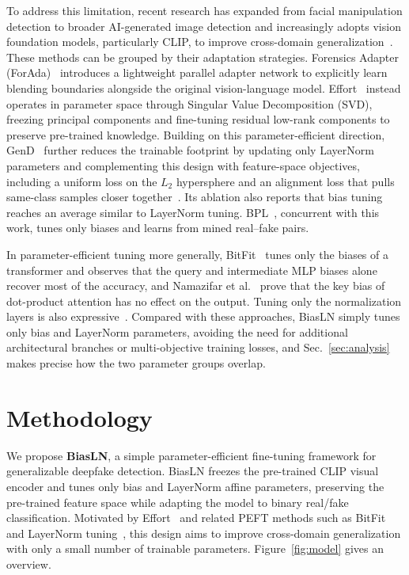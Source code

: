 \documentclass[fonts]{icst}
\newif\ifrevmark\revmarkfalse
\newcommand{\rev}[1]{\ifrevmark{\color{revblue}#1}\else#1\fi}
\begin{document}
To address this limitation, recent research has expanded from facial manipulation detection to broader AI-generated image detection and increasingly adopts vision foundation models, particularly CLIP, to improve cross-domain generalization~\cite{ojha2023universal,cui2025forada,yan2025effort,yermakov2025gend}. These methods can be grouped by their adaptation strategies. \rev{Forensics Adapter (ForAda)}~\cite{cui2025forada} introduces a lightweight parallel adapter network to explicitly learn blending boundaries alongside the original vision-language model. Effort~\cite{yan2025effort} instead operates in parameter space through Singular Value Decomposition (SVD), freezing principal components and fine-tuning residual low-rank components to preserve pre-trained knowledge. Building on this parameter-efficient direction, GenD~\cite{yermakov2025gend} further reduces the trainable footprint by updating only LayerNorm parameters and complementing this design with feature-space objectives, including a uniform loss on the $L_2$ hypersphere and an alignment loss that pulls same-class samples closer together\rev{~\cite{wang2020alignment}. Its ablation also reports that bias tuning reaches an average similar to LayerNorm tuning. BPL~\cite{xu2026bpl}, concurrent with this work, tunes only biases and learns from mined real--fake pairs.}

\rev{In parameter-efficient tuning more generally, BitFit~\cite{benzaken2022bitfit} tunes only the biases of a transformer and observes that the query and intermediate MLP biases alone recover most of the accuracy, and Namazifar et al.~\cite{namazifar2023bias} prove that the key bias of dot-product attention has no effect on the output. Tuning only the normalization layers is also expressive~\cite{giannou2023layernorm,wang2022ln,valizadeh2024layernorm}.}
Compared with these approaches, BiasLN simply tunes only bias and LayerNorm parameters, avoiding the need for additional architectural branches or multi-objective training losses\rev{, and Sec.~\ref{sec:analysis} makes precise how the two parameter groups overlap.}


\section{Methodology}
\label{sec:method}

We propose \textbf{BiasLN}, a simple parameter-efficient fine-tuning framework for generalizable deepfake detection. BiasLN freezes the pre-trained CLIP visual encoder and tunes only bias and LayerNorm affine parameters, preserving the pre-trained feature space while adapting the model to binary real/fake classification. Motivated by Effort~\cite{yan2025effort} and related PEFT methods such as BitFit~\cite{benzaken2022bitfit} and LayerNorm tuning~\cite{wang2022ln}, this design aims to improve cross-domain generalization with only a small number of trainable parameters. \rev{Figure~\ref{fig:model} gives an overview.}
\end{document}
